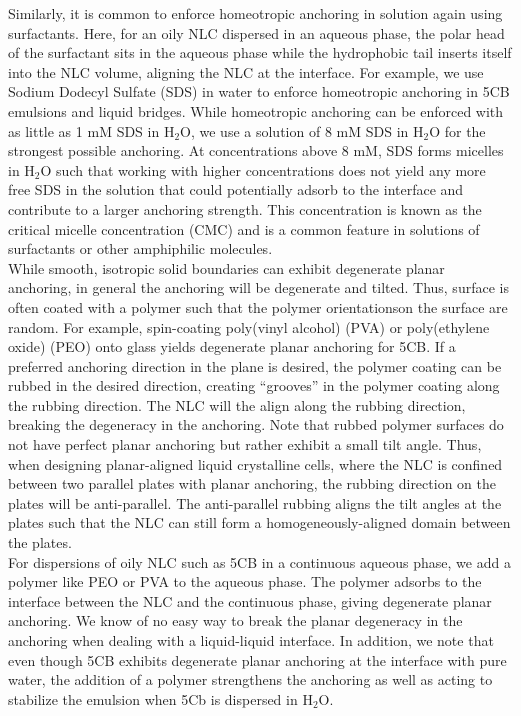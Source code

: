 Similarly, it is common to enforce homeotropic anchoring in solution again using surfactants.
Here, for an oily NLC dispersed in an aqueous phase, the polar head of the surfactant sits in the aqueous phase while the hydrophobic tail inserts itself into the NLC volume, aligning the NLC at the interface.
For example, we use Sodium Dodecyl Sulfate (SDS) in water to enforce homeotropic anchoring in 5CB emulsions and liquid bridges.
While homeotropic anchoring can be enforced with as little as 1 mM SDS in H$_2$O, we use a solution of 8 mM SDS in H$_2$O for the strongest possible anchoring.
At concentrations above 8 mM, SDS forms micelles in H$_2$O such that working with higher concentrations does not yield any more free SDS in the solution that could potentially adsorb to the interface and contribute to a larger anchoring strength.
This concentration is known as the critical micelle concentration (CMC) and is a common feature in solutions of surfactants or other amphiphilic molecules. \\

While smooth, isotropic solid boundaries can exhibit degenerate planar anchoring, in general the anchoring will be degenerate and tilted.
Thus, surface is often coated with a polymer such that the polymer orientationson the surface are random.
For example, spin-coating poly(vinyl alcohol) (PVA) or poly(ethylene oxide) (PEO) onto glass yields degenerate planar anchoring for 5CB.
If a preferred anchoring direction in the plane is desired, the polymer coating can be rubbed in the desired direction, creating ``grooves'' in the polymer coating along the rubbing direction.
The NLC will the align along the rubbing direction, breaking the degeneracy in the anchoring.
Note that rubbed polymer surfaces do not have perfect planar anchoring but rather exhibit a small tilt angle.
Thus, when designing planar-aligned liquid crystalline cells, where the NLC is confined between two parallel plates with planar anchoring, the rubbing direction on the plates will be anti-parallel.
The anti-parallel rubbing aligns the tilt angles at the plates such that the NLC can still form a homogeneously-aligned domain between the plates. \\

For dispersions of oily NLC such as 5CB in a continuous aqueous phase, we add a polymer like PEO or PVA to the aqueous phase.
The polymer adsorbs to the interface between the NLC and the continuous phase, giving degenerate planar anchoring.
We know of no easy way to break the planar degeneracy in the anchoring when dealing with a liquid-liquid interface.
In addition, we note that even though 5CB exhibits degenerate planar anchoring at the interface with pure water, the addition of a polymer strengthens the anchoring as well as acting to stabilize the emulsion when 5Cb is dispersed in H$_2$O. \\




